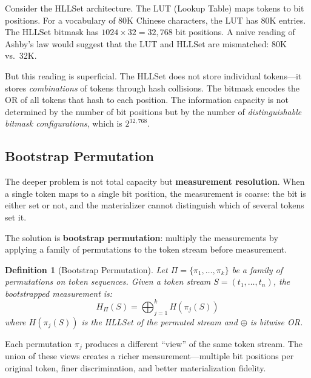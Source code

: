 \documentclass[11pt,a4paper]{article}
\newtheorem{definition}{Definition}[section]
\theoremstyle{remark}
\begin{document}
Consider the HLLSet architecture. The LUT (Lookup Table) maps tokens to bit positions.
For a vocabulary of 80K Chinese characters, the LUT has 80K entries. The HLLSet bitmask
has $1024 \times 32 = 32{,}768$ bit positions. A naive reading of Ashby's law would
suggest that the LUT and HLLSet are mismatched: 80K vs.\ 32K.

But this reading is superficial. The HLLSet does not store individual tokens---it
stores \textit{combinations} of tokens through hash collisions. The bitmask encodes the
OR of all tokens that hash to each position. The information capacity is not determined
by the number of bit positions but by the number of \textit{distinguishable bitmask
configurations}, which is $2^{32,768}$.

\subsection{Bootstrap Permutation}

The deeper problem is not total capacity but \textbf{measurement resolution}. When a
single token maps to a single bit position, the measurement is coarse: the bit is either
set or not, and the materializer cannot distinguish which of several tokens set it.

The solution is \textbf{bootstrap permutation}: multiply the measurements by applying a
family of permutations to the token stream before measurement.

\begin{definition}[Bootstrap Permutation]
Let $\Pi = \{\pi_1, \ldots, \pi_k\}$ be a family of permutations on token sequences.
Given a token stream $S = (t_1, \ldots, t_n)$, the bootstrapped measurement is:
\begin{equation}
  H_{\Pi}(S) = \bigoplus_{j=1}^{k} H(\pi_j(S))
\end{equation}
where $H(\pi_j(S))$ is the HLLSet of the permuted stream and $\oplus$ is bitwise OR.
\end{definition}

Each permutation $\pi_j$ produces a different ``view'' of the same token stream. The
union of these views creates a richer measurement---multiple bit positions per original
token, finer discrimination, and better materialization fidelity.
\end{document}
